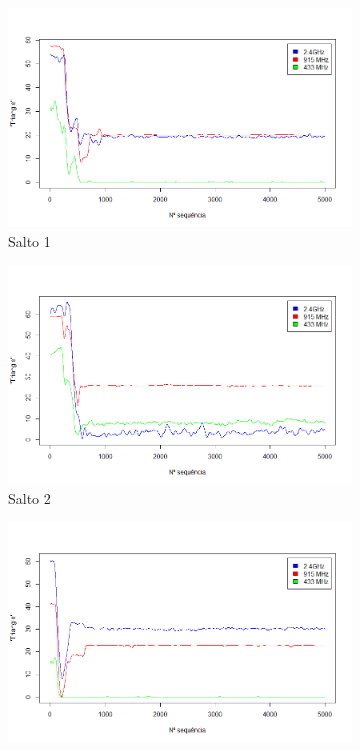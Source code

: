 \documentclass[
	12pt,				%
	openright,			%
	oneside,
	a4paper,			%
	english,			%
	french,				%
	spanish,			%
	brazil				%
	]{abntex2}
\begin{document}
\begin{figure}[b!]
	\centering
	\caption{Métrica \textit{Triangle}}
	\label{fig_trng_no_opt}
	\begin{subfigure}{.5\textwidth}
		\centering
		\includegraphics[width=.98\linewidth]{TRNG_Salto1}
		\captionsetup{width=.9\textwidth}
		\caption{Salto 1}
		\label{trng_no_opt_s1}
	\end{subfigure}%
	\begin{subfigure}{.5\textwidth}
		\centering
		\includegraphics[width=.98\linewidth]{TRNG_Salto2}
		\captionsetup{width=.9\textwidth}
		\caption{Salto 2}
		\label{trng_no_opt_s2}
	\end{subfigure}	
	\begin{subfigure}{.5\textwidth}
		\centering
		\includegraphics[width=.98\linewidth]{TRNG_Salto3}

\end{subfigure}
\end{figure}
\end{document}
